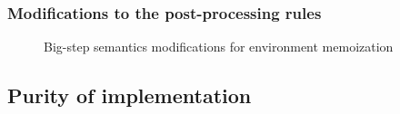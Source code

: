 \subsubsection{Modifications to the post-processing rules}
\label{sec:memoization-postprocessing}

\begin{figure}
  \centering
  \begin{mdframed}
    \begin{singlespace}
      
    \end{singlespace}
  \end{mdframed}
  \caption{Big-step semantics modifications for environment memoization}
  \label{fig:big-step-memoization-rules}
\end{figure}

\subsection{Purity of implementation}
\label{sec:env_purity}

